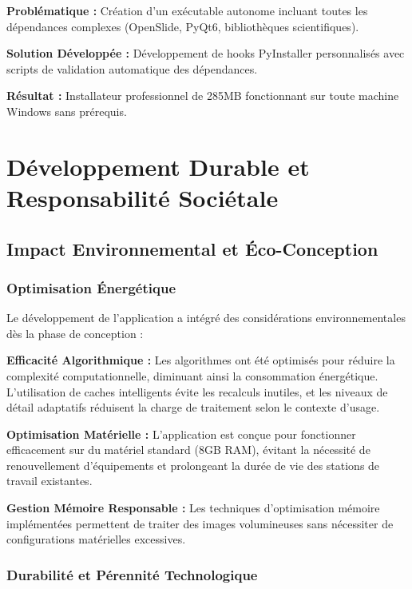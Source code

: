 \documentclass[12pt,a4paper]{article}
\begin{document}
\textbf{Problématique :} Création d'un exécutable autonome incluant toutes les dépendances complexes (OpenSlide, PyQt6, bibliothèques scientifiques).

\textbf{Solution Développée :} Développement de hooks PyInstaller personnalisés avec scripts de validation automatique des dépendances.

\textbf{Résultat :} Installateur professionnel de 285MB fonctionnant sur toute machine Windows sans prérequis.

\newpage

\section{Développement Durable et Responsabilité Sociétale}

\subsection{Impact Environnemental et Éco-Conception}

\subsubsection{Optimisation Énergétique}

Le développement de l'application a intégré des considérations environnementales dès la phase de conception :

\textbf{Efficacité Algorithmique :} Les algorithmes ont été optimisés pour réduire la complexité computationnelle, diminuant ainsi la consommation énergétique. L'utilisation de caches intelligents évite les recalculs inutiles, et les niveaux de détail adaptatifs réduisent la charge de traitement selon le contexte d'usage.

\textbf{Optimisation Matérielle :} L'application est conçue pour fonctionner efficacement sur du matériel standard (8GB RAM), évitant la nécessité de renouvellement d'équipements et prolongeant la durée de vie des stations de travail existantes.

\textbf{Gestion Mémoire Responsable :} Les techniques d'optimisation mémoire implémentées permettent de traiter des images volumineuses sans nécessiter de configurations matérielles excessives.

\subsubsection{Durabilité et Pérennité Technologique}
\end{document}
